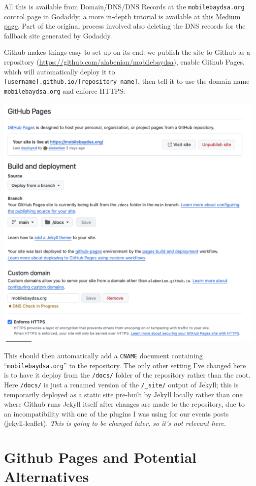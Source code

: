 \documentclass[
]{book}
\begin{document}
All this is available from Domain/DNS/DNS Records at the \texttt{mobilebaydsa.org} control page in Godaddy; a more in-depth tutorial is available at \href{https://medium.com/@nbblks/how-to-set-up-godaddy-domain-with-github-pages-eaa65f88a8ec}{this Medium page}. Part of the original process involved also deleting the DNS records for the fallback site generated by Godaddy.

Github makes things easy to set up on its end: we publish the site to Github as a repository (\url{https://github.com/alabenian/mobilebaydsa}), enable Github Pages, which will automatically deploy it to \texttt{{[}username{]}.github.io/{[}repository\ name{]}}, then tell it to use the domain name \texttt{mobilebaydsa.org} and enforce HTTPS:

\includegraphics[width=0.75\linewidth,height=\textheight,keepaspectratio]{github-pages.png}

This should then automatically add a \texttt{CNAME} document containing ``\texttt{mobilebaydsa.org}'' to the repository. The only other setting I've changed here is to have it deploy from the \texttt{/docs/} folder of the repository rather than the root. Here \texttt{/docs/} is just a renamed version of the \texttt{/\_site/} output of Jekyll; this is temporarily deployed as a static site pre-built by Jekyll locally rather than one where Github runs Jekyll itself after changes are made to the repository, due to an incompatibility with one of the plugins I was using for our events posts (jekyll-leaflet). \emph{This is going to be changed later, so it's not relevant here.}

\section{Github Pages and Potential Alternatives}\label{github-pages-and-potential-alternatives}
\end{document}
